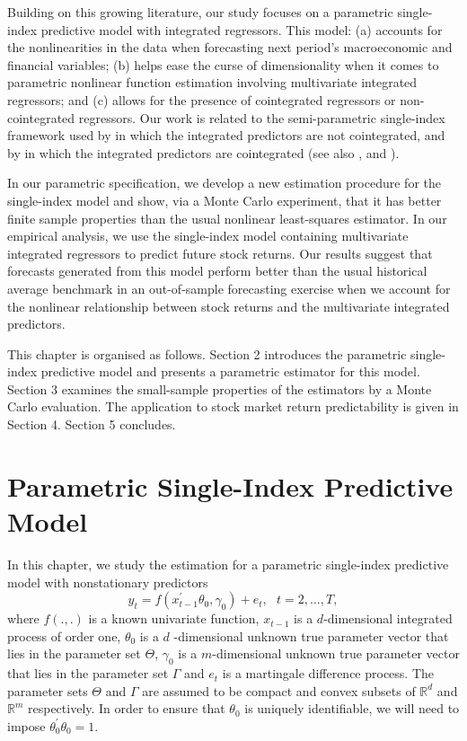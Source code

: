 \documentclass[a4paper,12pt,times,numbered,print,index]{report}
\numberwithin{equation}{section}
\begin{document}
	
	Building on this growing literature, our study focuses on a parametric single-index predictive model with integrated regressors. This model: (a) accounts for the nonlinearities in the data when forecasting next period's macroeconomic and financial variables; (b) helps ease the curse of dimensionality when it comes to parametric nonlinear function estimation involving multivariate integrated regressors; and (c) allows for the presence of cointegrated regressors or non-cointegrated regressors. Our work is related to the semi-parametric single-index framework used by \cite{dong2016estimation} in which the integrated predictors are not cointegrated, and by \cite{zhou2018semiparametric} in which the integrated predictors are cointegrated (see also \cite{xu2016testing}, \cite{lee2018lasso} and \cite{koo2020high}). 
	
	In our parametric specification, we develop a new estimation procedure for the single-index model and show, via a Monte Carlo experiment, that it has better finite sample properties than the usual nonlinear least-squares estimator. In our empirical analysis, we use the single-index model containing multivariate integrated regressors to predict future stock returns. Our results suggest that forecasts generated from this model perform better than the usual historical average benchmark in an out-of-sample forecasting exercise when we account for the nonlinear relationship between stock returns and the multivariate integrated predictors. 
	
	This chapter is organised as follows. Section 2 introduces the parametric single-index predictive model and presents a parametric estimator for this model. Section 3 examines the small-sample properties of the estimators by a Monte Carlo  evaluation. The application to stock market return predictability is given in Section 4. Section 5 concludes. 
	
	\section{Parametric Single-Index Predictive Model}
	
	In this chapter, we study the estimation for a parametric single-index predictive model with nonstationary predictors%
	\begin{equation}
		y_{t}=f\left( x_{t-1}^{\prime }\theta _{0},\gamma _{0}\right) +e_{t},\ \ \
		t=2,...,T,  \label{model}
	\end{equation}%
	where $f\left( .,.\right) $ is a known univariate function, $x_{t-1}$ is a $d
	$-dimensional integrated process of order one, $\theta _{0}$ is a $d$%
	-dimensional unknown true parameter vector that lies in the parameter set $%
	\Theta $, $\gamma _{0}$ is a $m$-dimensional unknown true parameter vector
	that lies in the parameter set $\Gamma $ and $e_{t}$ is a martingale
	difference process. The parameter sets $\Theta $ and $\Gamma $ are assumed
	to be compact and convex subsets of $\mathbb{R}^{d}$ and $\mathbb{R}^{m}$
	respectively. In order to ensure that $\theta_0$ is uniquely identifiable, we will need to impose $\theta_{0}^{\prime}\theta_{0} = 1$.
	
\end{document}
